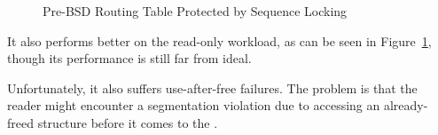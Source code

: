 \begin{figure}[tb]
\centering
{}
\caption{Pre-BSD Routing Table Protected by Sequence Locking}
\label{fig:defer:Pre-BSD Routing Table Protected by Sequence Locking}
\end{figure}

It also performs better on the read-only workload, as can be seen in
Figure~\ref{fig:defer:Pre-BSD Routing Table Protected by Sequence Locking},
though its performance is still far from ideal.

Unfortunately, it also suffers use-after-free failures.
The problem is that the reader might encounter a segmentation violation
due to accessing an already-freed structure before it comes to the
.


